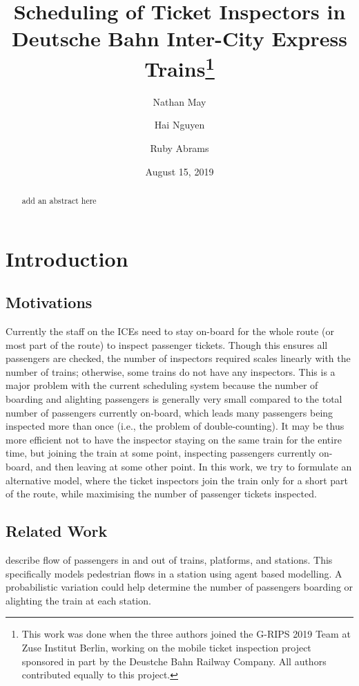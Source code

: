 \documentclass[11pt]{article}
\title{Scheduling of Ticket Inspectors in Deutsche Bahn Inter-City Express Trains\footnote{This work was done when the three authors joined the G-RIPS 2019 Team at Zuse Institut Berlin,  working
on the mobile ticket inspection
project sponsored in part 
by the Deustche Bahn Railway Company. All authors contributed equally to this project.}}
\author[1]{Nathan May}
\author[2]{Hai Nguyen}
\author[3]{Ruby Abrams}
\affil[1]{Department of Mathematics,  Washington State University, U.S.A.}
\affil[2]{School of Computer Science,  University of Birmingham, U.K.}
\affil[3]{Department of Mathematics,  University of Arizona, U.S.A.}
\date{August 15, 2019}
\begin{document}
\maketitle

\begin{abstract}
add an abstract here
\end{abstract}

\tableofcontents

\section{Introduction}

\subsection{Motivations}

\par 
Currently the staff on the ICEs 
need to stay on-board for the whole route (or most part of the route) to inspect passenger tickets. Though this ensures all passengers are checked,
the number of inspectors required scales linearly with the number of trains; otherwise, some trains
do not have any inspectors. This is a major problem with the current scheduling system because
the number of boarding and alighting passengers is generally very small compared to the 
total number of passengers currently on-board, which leads many passengers being
inspected more than once (i.e., the problem of double-counting). It may be thus more
efficient not to have the inspector staying on the same train for the entire time, but joining 
the train at some point, inspecting passengers currently on-board, and then leaving at some other
point. In this work, we try to formulate an alternative
model, where the ticket inspectors join the train 
only for a short part of the route, while maximising the number of passenger tickets inspected. 
  
\subsection{Related Work}

\citet{gao_jia_2016} describe flow of passengers in and out of trains, platforms, and stations. This specifically models pedestrian flows in a station using agent based modelling. A probabilistic variation could help determine the number of passengers boarding or alighting the train at each station.
\end{document}

